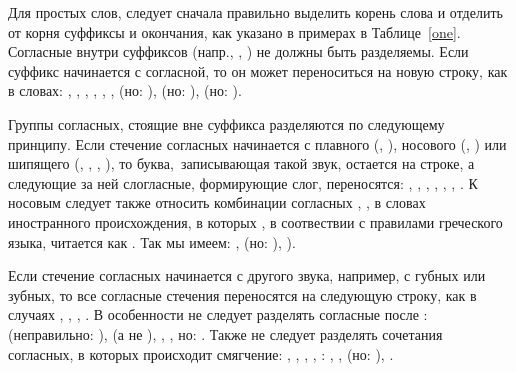 \documentclass[12pt,a4paper,oneside]{extarticle}
\begin{document}
Для простых слов, следует сначала правильно выделить корень слова и отделить от корня суффиксы и окончания, как указано в примерах в Таблице~\ref{one}. Согласные внутри суффиксов (напр., , ) не должны быть разделяемы. Если суффикс начинается с согласной, то он может переноситься на новую строку, как в словах: , , , , , ,  (но: ),  (но: ),  (но: ).

Группы согласных, стоящие вне суффикса разделяются по следующему принципу. Если стечение согласных начинается с плавного (, ), носового (, ) или шипящего (, , , ), то буква, записывающая такой звук, остается на строке, а следующие за ней слогласные, формирующие слог, переносятся: , , , , , , . К носовым следует также относить комбинации согласных , ,  в словах иностранного происхождения, в которых , в соотвествии с правилами греческого языка, читается как . Так мы имеем: ,  (но: ), ).

Если стечение согласных начинается с другого звука, например, с губных или зубных, то все согласные стечения переносятся на следующую строку, как в случаях , , , . В особенности не следует разделять согласные после :  (неправильно: ),  (а не ), , , но: . Также не следует разделять сочетания согласных, в которых происходит смягчение: , , , , : , ,  (но: ), .
\end{document}
